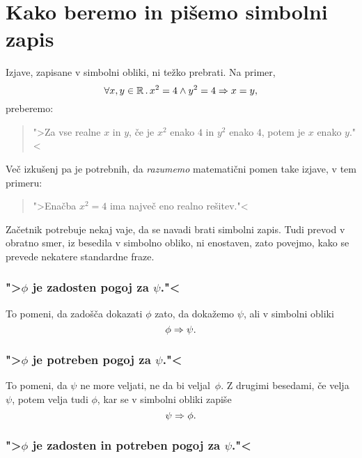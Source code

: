 
\section{Kako beremo in pišemo simbolni zapis}
\label{sec:simbolni-zapis}

Izjave, zapisane v simbolni obliki, ni težko prebrati. Na primer,
%
\begin{equation*}
  \forall x, y \in \mathbb{R} \,.\,
    x^2 = 4 \land y^2 = 4 \Rightarrow x = y,
\end{equation*}
%
preberemo:
%
\begin{quote}
  ">Za vse realne $x$ in $y$, če je $x^2$ enako $4$ in $y^2$ enako
  $4$, potem je $x$ enako $y$."<
\end{quote}
%
Več izkušenj pa je potrebnih, da \emph{razumemo} matematični pomen
take izjave, v tem primeru:
%
\begin{quote}
  ">Enačba $x^2 = 4$ ima največ eno realno rešitev."<
\end{quote}
%
Začetnik potrebuje nekaj vaje, da se navadi brati simbolni zapis. Tudi
prevod v obratno smer, iz besedila v simbolno obliko, ni enostaven,
zato povejmo, kako se prevede nekatere standardne fraze.

\subsubsection{">$\phi$ je zadosten pogoj za $\psi$."<}

To pomeni, da zadošča dokazati $\phi$ zato, da dokažemo $\psi$, ali v
simbolni obliki
%
\begin{equation*}
  \phi \Rightarrow \psi.
\end{equation*}

\subsubsection{">$\phi$ je potreben pogoj za $\psi$."<}

To pomeni, da $\psi$ ne more veljati, ne da bi veljal~$\phi$. Z drugimi
besedami, če velja $\psi$, potem velja tudi $\phi$, kar se v simbolni obliki
zapiše
%
\begin{equation*}
  \psi \Rightarrow \phi.
\end{equation*}

\subsubsection{">$\phi$ je zadosten in potreben pogoj za $\psi$."<}

